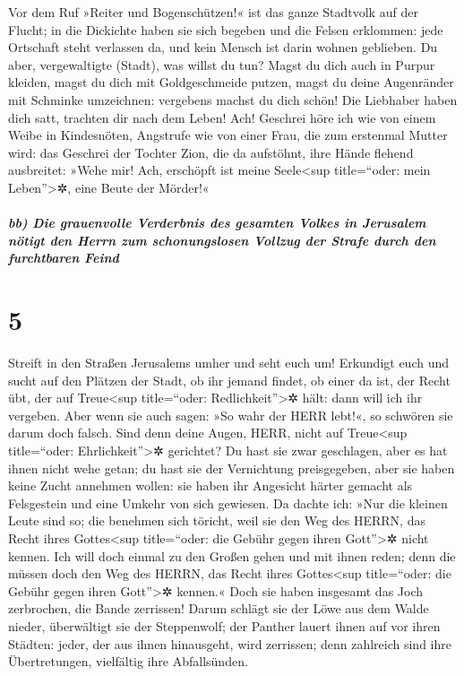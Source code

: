 Vor dem Ruf »Reiter und Bogenschützen!« ist das ganze
Stadtvolk auf der Flucht; in die Dickichte haben sie sich begeben und
die Felsen erklommen: jede Ortschaft steht verlassen da, und kein Mensch
ist darin wohnen geblieben. Du aber, vergewaltigte
(Stadt), was willst du tun? Magst du dich auch in Purpur kleiden, magst
du dich mit Goldgeschmeide putzen, magst du deine Augenränder mit
Schminke umzeichnen: vergebens machst du dich schön! Die Liebhaber haben
dich satt, trachten dir nach dem Leben! Ach! Geschrei
höre ich wie von einem Weibe in Kindesnöten, Angstrufe wie von einer
Frau, die zum erstenmal Mutter wird: das Geschrei der Tochter Zion, die
da aufstöhnt, ihre Hände flehend ausbreitet: »Wehe mir! Ach, erschöpft
ist meine Seele\textless sup title=``oder: mein Leben''\textgreater✲,
eine Beute der Mörder!«

\hypertarget{bb-die-grauenvolle-verderbnis-des-gesamten-volkes-in-jerusalem-nuxf6tigt-den-herrn-zum-schonungslosen-vollzug-der-strafe-durch-den-furchtbaren-feind}{%
\subparagraph{bb) Die grauenvolle Verderbnis des gesamten Volkes in
Jerusalem nötigt den Herrn zum schonungslosen Vollzug der Strafe durch
den furchtbaren
Feind}\label{bb-die-grauenvolle-verderbnis-des-gesamten-volkes-in-jerusalem-nuxf6tigt-den-herrn-zum-schonungslosen-vollzug-der-strafe-durch-den-furchtbaren-feind}}

\hypertarget{section-4}{%
\section{5}\label{section-4}}

Streift in den Straßen Jerusalems umher und seht euch um!
Erkundigt euch und sucht auf den Plätzen der Stadt, ob ihr jemand
findet, ob einer da ist, der Recht übt, der auf Treue\textless sup
title=``oder: Redlichkeit''\textgreater✲ hält: dann will ich ihr
vergeben. Aber wenn sie auch sagen: »So wahr der HERR
lebt!«, so schwören sie darum doch falsch. Sind denn deine
Augen, HERR, nicht auf Treue\textless sup title=``oder:
Ehrlichkeit''\textgreater✲ gerichtet? Du hast sie zwar geschlagen, aber
es hat ihnen nicht wehe getan; du hast sie der Vernichtung preisgegeben,
aber sie haben keine Zucht annehmen wollen: sie haben ihr Angesicht
härter gemacht als Felsgestein und eine Umkehr von sich gewiesen.
Da dachte ich: »Nur die kleinen Leute sind so; die
benehmen sich töricht, weil sie den Weg des HERRN, das Recht ihres
Gottes\textless sup title=``oder: die Gebühr gegen ihren
Gott''\textgreater✲ nicht kennen. Ich will doch einmal zu
den Großen gehen und mit ihnen reden; denn die müssen doch den Weg des
HERRN, das Recht ihres Gottes\textless sup title=``oder: die Gebühr
gegen ihren Gott''\textgreater✲ kennen.« Doch sie haben insgesamt das
Joch zerbrochen, die Bande zerrissen! Darum schlägt sie
der Löwe aus dem Walde nieder, überwältigt sie der Steppenwolf; der
Panther lauert ihnen auf vor ihren Städten: jeder, der aus ihnen
hinausgeht, wird zerrissen; denn zahlreich sind ihre Übertretungen,
vielfältig ihre Abfallsünden.

